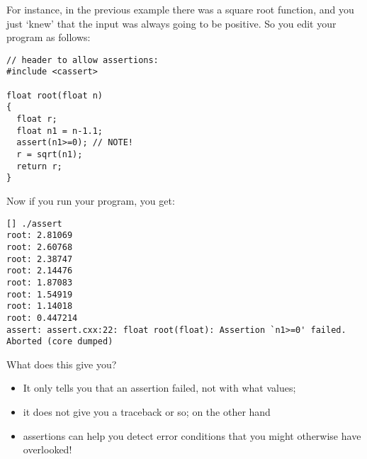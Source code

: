For instance, in the previous example there was a square root function,
and you just `knew' that the input was always going to be positive.
So you edit your program as follows:
\begin{lstlisting}
// header to allow assertions:
#include <cassert>

float root(float n)
{
  float r;
  float n1 = n-1.1;
  assert(n1>=0); // NOTE!
  r = sqrt(n1);
  return r;
}
\end{lstlisting}
Now if you run your program, you get:
\begin{verbatim}
[] ./assert
root: 2.81069
root: 2.60768
root: 2.38747
root: 2.14476
root: 1.87083
root: 1.54919
root: 1.14018
root: 0.447214
assert: assert.cxx:22: float root(float): Assertion `n1>=0' failed.
Aborted (core dumped)
\end{verbatim}
What does this give you?
\begin{itemize}
\item It only tells you that an assertion failed, not with what values;
\item it does not give you a traceback or so; on the other hand
\item assertions can help you detect error conditions that you might
  otherwise have overlooked!
\end{itemize}
